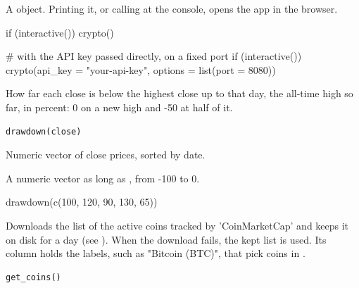 \documentclass[a4paper]{book}
\begin{document}
%
\begin{Value}
A  object. Printing it, or calling  at
the console, opens the app in the browser.
\end{Value}
%
\begin{Examples}
\begin{ExampleCode}
if (interactive()) crypto()

# with the API key passed directly, on a fixed port
if (interactive()) crypto(api_key = "your-api-key", options = list(port = 8080))
\end{ExampleCode}
\end{Examples}
%
\begin{Description}
How far each close is below the highest close up to that day, the
all-time high so far, in percent: 0 on a new high and -50 at half of it.
\end{Description}
%
\begin{Usage}
\begin{verbatim}
drawdown(close)
\end{verbatim}
\end{Usage}
%
\begin{Arguments}
\begin{ldescription}
\item[\code{close}] Numeric vector of close prices, sorted by date.
\end{ldescription}
\end{Arguments}
%
\begin{Value}
A numeric vector as long as , from -100 to 0.
\end{Value}
%
\begin{Examples}
\begin{ExampleCode}
drawdown(c(100, 120, 90, 130, 65))
\end{ExampleCode}
\end{Examples}
%
\begin{Description}
Downloads the list of the active coins tracked by 'CoinMarketCap' and
keeps it on disk for a day (see ). When the download fails,
the kept list is used. Its  column holds the labels, such as
"Bitcoin (BTC)", that pick coins in .
\end{Description}
%
\begin{Usage}
\begin{verbatim}
get_coins()
\end{verbatim}
\end{Usage}
\end{document}
